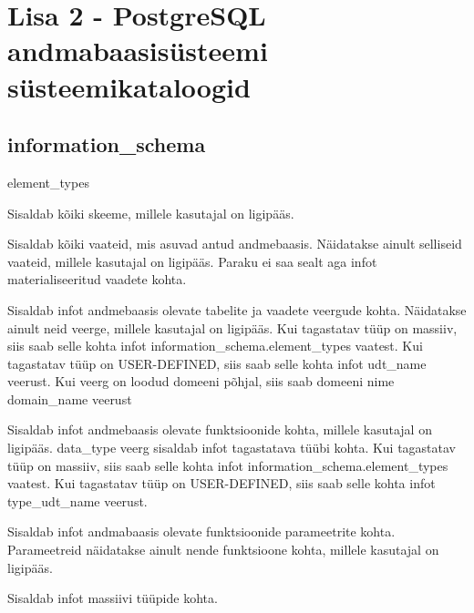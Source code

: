\documentclass[a4paper,12pt]{article} %
\begin{document}
\section*{Lisa 2 - PostgreSQL andmabaasisüsteemi süsteemikataloogid}
\label{lisa_postgresql_kataloogid}
\subsection*{information\_schema}
\begin{labeling}{element\_types}
\item [schemata] Sisaldab kõiki skeeme, millele kasutajal on ligipääs.
\item [views] Sisaldab kõiki vaateid, mis asuvad antud andmebaasis. Näidatakse ainult selliseid vaateid, millele kasutajal on ligipääs. Paraku ei saa sealt aga infot materialiseeritud vaadete kohta.
\item [columns] Sisaldab infot andmebaasis olevate tabelite ja vaadete veergude kohta. Näidatakse ainult neid veerge, millele kasutajal on ligipääs. Kui tagastatav tüüp on massiiv, siis saab selle kohta infot information\_schema.element\_types vaatest. Kui tagastatav tüüp on USER-DEFINED, siis saab selle kohta infot udt\_name veerust. Kui veerg on loodud domeeni põhjal, siis saab domeeni nime domain\_name veerust
\item [routines] Sisaldab infot andmebaasis olevate funktsioonide kohta, millele kasutajal on ligipääs. data\_type veerg sisaldab infot tagastatava tüübi kohta. Kui tagastatav tüüp on massiiv, siis saab selle kohta infot information\_schema.element\_types vaatest. Kui tagastatav tüüp on USER-DEFINED, siis saab selle kohta infot type\_udt\_name veerust.
\item [parameters] Sisaldab infot andmabaasis olevate funktsioonide parameetrite kohta. Parameetreid näidatakse ainult nende funktsioone kohta, millele kasutajal on ligipääs.
\item [element\_types] Sisaldab infot massiivi tüüpide kohta.
\end{labeling}
\cite{PostgreSQLInformationSchema}
\end{document}
